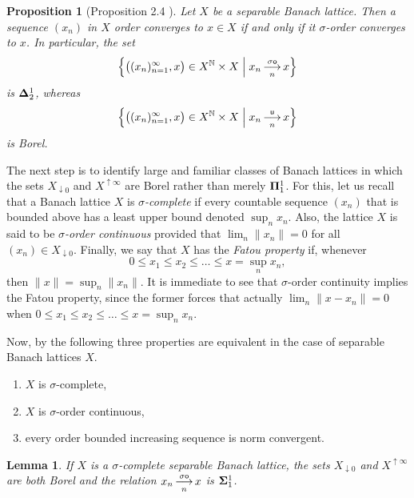 \documentclass[10pt]{amsart}
\newcommand{\norm}[1]{\lVert#1\rVert}
\newcommand{\conv}[2]{\mathop{\underset{#2}{\overset{#1}\longrightarrow}}}
\newcommand {\1}{\mathbb 1}
\newcommand {\N}{\mathbb N}
\newcommand {\Del}{ \; \Big| \;}
\theoremstyle{plain}
\newtheorem{lemme}[thm]{Lemma}
\newtheorem{prop} [thm] {Proposition}
\theoremstyle{definition}
\begin{document}
\begin{prop}[Proposition 2.4 \cite{ARTT}]\label{prop conv agree}
Let $X$ be a separable Banach lattice. Then a sequence $(x_n)$ in $X$ order converges to $x\in X$ if and only if it $\sigma$-order converges to $x$.  In particular, the set 
\begin{equation}\label{compl of sigma-o}
    \Big\{ \big((x_n)_{n=1}^\infty,x\big)\in X^\N\times X\Del x_n\conv{\sigma\sf o}{n}x\Big\}
\end{equation}
is ${\bf \Delta}^1_2$, whereas
$$
\Big\{ \big((x_n)_{n=1}^\infty,x\big)\in X^\N\times X\Del x_n\conv{\sf u}{n}x\Big\}
$$ 
is Borel.
\end{prop}



The next step is to identify large and familiar classes of Banach lattices in which the sets $X_{\downarrow 0}$ and $X^{\uparrow \infty}$ are Borel rather than merely ${\bf \Pi}^1_1$. For this, let us recall that a Banach lattice $X$ is {\em $\sigma$-complete} if every countable sequence $(x_n)$ that is bounded above has a least upper bound denoted  $\sup_nx_n$. Also, the lattice $X$ is said to be {\em $\sigma$-order continuous} provided that $\lim_n\norm{x_n}=0$ for all  $(x_n)\in X_{\downarrow 0}$. Finally, we say that $X$ has the {\em Fatou property} if, whenever
$$
0\leqslant x_1\leqslant x_2\leqslant \ldots\leqslant x=\sup_n x_n,
$$
then $\norm{x}=\sup_n\norm{x_n}$. It is immediate to see that $\sigma$-order continuity implies the Fatou property, since the former forces that actually $\lim_n\norm{x-x_n}=0$ when $0\leqslant x_1\leqslant x_2\leqslant \ldots\leqslant x=\sup_n x_n$.

Now, by \cite[Propositions 1.a.7 and 1.a.8]{LT2} the following three properties are equivalent in the case of separable Banach lattices $X$.
\begin{enumerate}
\item $X$ is $\sigma$-complete,
    \item $X$ is $\sigma$-order continuous,
    \item every order bounded increasing sequence is norm convergent.
\end{enumerate}



\begin{lemme}
    If $X$ is a $\sigma$-complete separable Banach lattice, the sets $X_{\downarrow 0}$ and $X^{\uparrow \infty}$ are both Borel and the relation $x_n\conv{\sigma\sf o}{n}x$ is ${\bf \Sigma}^1_1$.
\end{lemme}
\end{document}
